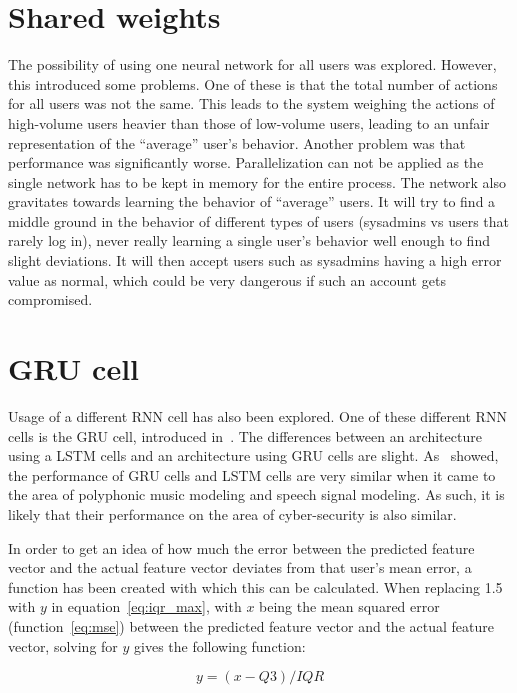 \section{Shared weights}
The possibility of using one neural network for all users was explored. However, this introduced some problems. One of these is that the total number of actions for all users was not the same. This leads to the system weighing the actions of high-volume users heavier than those of low-volume users, leading to an unfair representation of the \enquote{average} user's behavior. Another problem was that performance was significantly worse. Parallelization can not be applied as the single network has to be kept in memory for the entire process. The network also gravitates towards learning the behavior of \enquote{average} users. It will try to find a middle ground in the behavior of different types of users (sysadmins vs users that rarely log in), never really learning a single user's behavior well enough to find slight deviations. It will then accept users such as sysadmins having a high error value as normal, which could be very dangerous if such an account gets compromised.

\section{GRU cell}
Usage of a different RNN cell has also been explored. One of these different RNN cells is the GRU cell, introduced in~\cite{cho2014learning}. The differences between an architecture using a LSTM cells and an architecture using GRU cells are slight. As~\cite{chung2014empirical} showed, the performance of GRU cells and LSTM cells are very similar when it came to the area of polyphonic music modeling and speech signal modeling. As such, it is likely that their performance on the area of cyber-security is also similar. 

In order to get an idea of how much the error between the predicted feature vector and the actual feature vector deviates from that user's mean error, a function has been created with which this can be calculated. When replacing 1.5 with \(y\) in equation~\ref{eq:iqr_max}, with \(x\) being the mean squared error (function~\ref{eq:mse}) between the predicted feature vector and the actual feature vector, solving for \(y\) gives the following function:

\begin{equation} \label{eq:y}
y = (x - Q3) / IQR
\end{equation}

